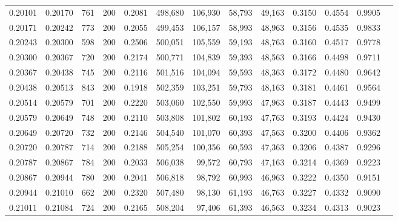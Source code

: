 \begin{tabular}{rrrrrrrrrrrrr}
0.20101 & 0.20170 &   761 & 200 &                                     0.2081 & 498,680 & 106,930 &  58,793 &  49,163 & 0.3150 & 0.4554 & 0.9905 \\
0.20171 & 0.20242 &   773 & 200 &                                     0.2055 & 499,453 & 106,157 &  58,993 &  48,963 & 0.3156 & 0.4535 & 0.9833 \\
0.20243 & 0.20300 &   598 & 200 &                                     0.2506 & 500,051 & 105,559 &  59,193 &  48,763 & 0.3160 & 0.4517 & 0.9778 \\
0.20300 & 0.20367 &   720 & 200 &                                     0.2174 & 500,771 & 104,839 &  59,393 &  48,563 & 0.3166 & 0.4498 & 0.9711 \\
0.20367 & 0.20438 &   745 & 200 &                                     0.2116 & 501,516 & 104,094 &  59,593 &  48,363 & 0.3172 & 0.4480 & 0.9642 \\
0.20438 & 0.20513 &   843 & 200 &                                     0.1918 & 502,359 & 103,251 &  59,793 &  48,163 & 0.3181 & 0.4461 & 0.9564 \\
0.20514 & 0.20579 &   701 & 200 &                                     0.2220 & 503,060 & 102,550 &  59,993 &  47,963 & 0.3187 & 0.4443 & 0.9499 \\
0.20579 & 0.20649 &   748 & 200 &                                     0.2110 & 503,808 & 101,802 &  60,193 &  47,763 & 0.3193 & 0.4424 & 0.9430 \\
0.20649 & 0.20720 &   732 & 200 &                                     0.2146 & 504,540 & 101,070 &  60,393 &  47,563 & 0.3200 & 0.4406 & 0.9362 \\
0.20720 & 0.20787 &   714 & 200 &                                     0.2188 & 505,254 & 100,356 &  60,593 &  47,363 & 0.3206 & 0.4387 & 0.9296 \\
0.20787 & 0.20867 &   784 & 200 &                                     0.2033 & 506,038 &  99,572 &  60,793 &  47,163 & 0.3214 & 0.4369 & 0.9223 \\
0.20867 & 0.20944 &   780 & 200 &                                     0.2041 & 506,818 &  98,792 &  60,993 &  46,963 & 0.3222 & 0.4350 & 0.9151 \\
0.20944 & 0.21010 &   662 & 200 &                                     0.2320 & 507,480 &  98,130 &  61,193 &  46,763 & 0.3227 & 0.4332 & 0.9090 \\
0.21011 & 0.21084 &   724 & 200 &                                     0.2165 & 508,204 &  97,406 &  61,393 &  46,563 & 0.3234 & 0.4313 & 0.9023 \\

\end{tabular}
